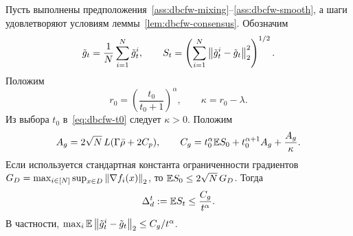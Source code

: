 \begin{lemma}
\label{lem:dbcfw-gradient-tracking}
Пусть выполнены предположения~\ref{ass:dbcfw-mixing}--\ref{ass:dbcfw-smooth}, а шаги
удовлетворяют условиям леммы~\ref{lem:dbcfw-consensus}.
Обозначим
\[
    \tilde g_t=\frac1N\sum_{i=1}^N\tilde g_t^i,
    \qquad
    S_t=
    \left(
        \sum_{i=1}^N\left\|\tilde g_t^i-\tilde g_t\right\|_2^2
    \right)^{1/2}.
\]
Положим
\[
    r_0=\left(\frac{t_0}{t_0+1}\right)^\alpha,
    \qquad
    \kappa=r_0-\lambda.
\]
Из выбора $t_0$ в~\eqref{eq:dbcfw-t0} следует $\kappa>0$.
Положим
\[
    A_g=2\sqrt N\,L(\Gamma\bar\rho+2C_p),
    \qquad
    C_g
    =
    t_0^\alpha\mathbb{E} S_0
    +
    t_0^{\alpha+1}A_g
    +
    \frac{A_g}{\kappa}.
\]
Если используется стандартная константа ограниченности градиентов
$G_D=\max_{i\in[N]}\sup_{x\in D}\left\|\nabla f_i(x)\right\|_2$, то
$\mathbb{E} S_0\leq 2\sqrt N\,G_D$.
Тогда
\begin{equation}
\label{eq:dbcfw-gt-bound}
    \Delta_d^t
    :=
    \mathbb{E} S_t
    \leq
    \frac{C_g}{t^\alpha}.
\end{equation}
В частности,
$\max_i\mathbb{E}\left\|\tilde g_t^i-\tilde g_t\right\|_2\leq C_g/t^\alpha$.
\end{lemma}

